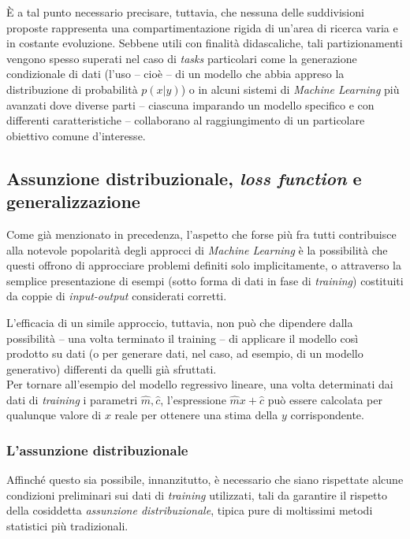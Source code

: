 \documentclass[a4paper, twoside]{article}
\begin{document}
È a tal punto necessario precisare, tuttavia, che nessuna delle suddivisioni proposte rappresenta una compartimentazione rigida di un'area di ricerca varia e in costante evoluzione. Sebbene utili con finalità didascaliche, tali partizionamenti vengono spesso superati nel caso di \textit{tasks} particolari come la generazione condizionale di dati (l'uso -- cioè -- di un modello che abbia appreso la distribuzione di probabilità $p(x|y)$) o in alcuni sistemi di \textit{Machine Learning} più avanzati dove diverse parti -- ciascuna imparando un modello specifico e con differenti caratteristiche -- collaborano al raggiungimento di un particolare obiettivo comune d'interesse.


\subsection{Assunzione distribuzionale, \textit{loss function} e generalizzazione}

Come già menzionato in precedenza, l'aspetto che forse più fra tutti contribuisce alla notevole popolarità degli approcci di \textit{Machine Learning} è la possibilità che questi offrono di approcciare problemi definiti solo implicitamente, o attraverso la semplice presentazione di esempi (sotto forma di dati in fase di \textit{training}) costituiti da coppie di \textit{input-output} considerati corretti.

L'efficacia di un simile approccio, tuttavia, non può che dipendere dalla possibilità -- una volta terminato il training -- di applicare il modello così prodotto su dati (o per generare dati, nel caso, ad esempio, di un modello generativo) differenti da quelli già sfruttati.\\
Per tornare all'esempio del modello regressivo lineare, una volta determinati dai dati di \textit{training} i parametri $\hat{m}, \hat{c}$, l'espressione $\hat{m}x + \hat{c}$ può essere calcolata per qualunque valore di $x$ reale per ottenere una stima della $y$ corrispondente.

\subsubsection{L'assunzione distribuzionale}

Affinché questo sia possibile, innanzitutto, è necessario che siano rispettate alcune condizioni preliminari sui dati di \textit{training} utilizzati, tali da garantire il rispetto della cosiddetta \textit{assunzione distribuzionale}, tipica pure di moltissimi metodi statistici più tradizionali.
\end{document}
